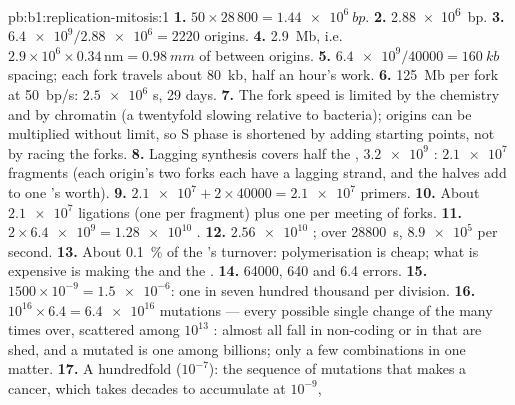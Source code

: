 \begin{solution}{pb:b1:replication-mitosis:1}
\textbf{1.} $50\times 28\,800 = \qty{1.44e6}{bp}$.
\textbf{2.} \qty{2.88e6}{bp}.
\textbf{3.} $\num{6.4e9}/\num{2.88e6} = 2220$ origins.
\textbf{4.} \qty{2.9}{Mb}, i.e.\ $2.9\times 10^6\times 0.34\,\mathrm{nm} =
\qty{0.98}{mm}$ of  between origins.
\textbf{5.} $\num{6.4e9}/\num{40000} = \qty{160}{kb}$ spacing; each
fork travels about \qty{80}{kb}, half an hour's work.
\textbf{6.} \qty{125}{Mb} per fork at \qty{50}{bp/s}: $\num{2.5e6}$ s,
29 days.
\textbf{7.} The fork speed is limited by the chemistry and by
chromatin (a twentyfold slowing relative to bacteria); origins can be
multiplied without limit, so S phase is shortened by adding starting
points, not by racing the forks.
\textbf{8.} Lagging synthesis covers half the , $\num{3.2e9}$
: $\num{2.1e7}$ fragments (each origin's two forks each have
a lagging strand, and the halves add to one 's worth).
\textbf{9.} $\num{2.1e7} + 2\times\num{40000} = \num{2.1e7}$ primers.
\textbf{10.} About $\num{2.1e7}$ ligations (one per fragment) plus one
per meeting of forks.
\textbf{11.} $2\times\num{6.4e9} = \num{1.28e10}$ .
\textbf{12.} $\num{2.56e10}$ ; over \qty{28800}{s}, $\num{8.9e5}$
per second.
\textbf{13.} About \qty{0.1}{\%} of the 's  turnover:
polymerisation is cheap; what is expensive is making the 
and the .
\textbf{14.} \num{64000}, 640 and 6.4 errors.
\textbf{15.} $1500\times 10^{-9} = \num{1.5e-6}$: one  in seven
hundred thousand per division.
\textbf{16.} $10^{16}\times 6.4 = \num{6.4e16}$ mutations --- every
possible single change of the  many times over, scattered among
$10^{13}$ : almost all fall in non-coding  or in  that
are shed, and a mutated  is one among billions; only a few
combinations in one  matter.
\textbf{17.} A hundredfold ($10^{-7}$): the sequence of mutations that
makes a cancer, which takes decades to accumulate at $10^{-9}$,

\end{solution}
